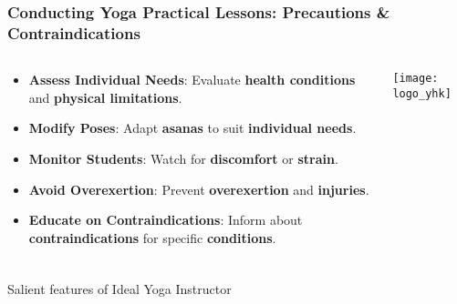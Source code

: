 \begin{frame}[fragile]\frametitle{Conducting Yoga Practical Lessons: Precautions \& Contraindications}
\begin{columns}
    \begin{column}[T]{0.5\linewidth}
      \begin{itemize}
        \item \textbf{Assess Individual Needs}: Evaluate \textbf{health conditions} and \textbf{physical limitations}.
        \item \textbf{Modify Poses}: Adapt \textbf{asanas} to suit \textbf{individual needs}.
        \item \textbf{Monitor Students}: Watch for \textbf{discomfort} or \textbf{strain}.
        \item \textbf{Avoid Overexertion}: Prevent \textbf{overexertion} and \textbf{injuries}.
        \item \textbf{Educate on Contraindications}: Inform about \textbf{contraindications} for specific \textbf{conditions}.
      \end{itemize}
    \end{column}
    \begin{column}[T]{0.5\linewidth}
        \begin{center}
        \texttt{[image: logo\_yhk]}
        \end{center}	
    \end{column}
\end{columns}
\end{frame}


\begin{frame}[fragile]\frametitle{}
\begin{center}
{\Large Salient features of Ideal Yoga Instructor}
\end{center}
\end{frame}


